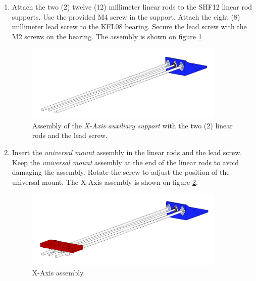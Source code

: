 \documentclass{article}
\begin{document}
\begin{enumerate}
    \item Attach the two (2) twelve (12) millimeter linear rods to the SHF12 linear rod supports. Use the provided M4 screw in the support. Attach the eight (8) millimeter lead screw to the KFL08 bearing. Secure the lead screw with the M2 screws on the bearing. The assembly is shown on figure \ref{fig:xa_step_3}
    
    \begin{figure}[H]
        \centering
        \includegraphics[width=0.9\textwidth]{images/x_axis/step_C.png}
        \caption{Assembly of the \textit{X-Axis auxiliary support} with the two (2) linear rods and the lead screw.}
        \label{fig:xa_step_3}
    \end{figure}
    
    \item Insert the \textit{universal mount} assembly in the linear rods and the lead screw. Keep the \textit{universal mount} assembly at the end of the linear rods to avoid damaging the assembly. Rotate the screw to adjust the position of the universal mount. The X-Axis assembly is shown on figure \ref{fig:xa_step_4}.
    
    \begin{figure}[H]
        \centering
        \includegraphics[width=0.9\textwidth]{images/x_axis/step_D.png}
        \caption{X-Axis assembly.}
        \label{fig:xa_step_4}
    \end{figure}

\end{enumerate}

\newpage
\end{document}
